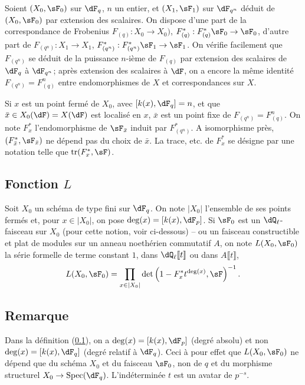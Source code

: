 Soient $(X_0,\sF_0)$ sur $\dF_q$, $n$ un entier, et $(X_1,\sF_1)$ sur 
$\dF_{q^n}$ déduit de $(X_0,\sF_0)$ par extension des scalaires. On dispose 
d'une part de la correspondance de Frobenius $F_{(q)}:X_0\to X_0)$, 
$F_{(q)}^*:F_{(q)}^*\sF_0\to \sF_0$, d'autre part de 
$F_{(q^n)}:X_1\to X_1$, $F_{(q^n)}^*:F_{(q^n)}^*\sF_1\to\sF_1$. On vérifie 
facilement que $F_{(q^n)}$ se déduit de la puissance $n$-ième de $F_{(q)}$ 
par extension des scalaires de $\dF_q$ à $\dF_{q^n}$; après extension des 
scalaires à $\dF$, on a encore la même identité $F_{(q^n)}=F_{(q)}^n$ 
entre endomorphismes de $X$ et correspondances sur $X$. 

Si $x$ est un point fermé de $X_0$, avec $[k(x),\dF_q]=n$, et que 
$\bar x\in X_0(\dF) = X(\dF)$ est localisé en $x$, $\bar x$ est un point 
fixe de $F_{(q^n)}=F_{(q)}^n$. On note $F_x^*$ l'endomorphisme de 
$\sF_{\bar x}$ induit par $F_{(q^n)}^*$. A isomorphisme près, 
$(F_{\bar x}^*,\sF_{\bar x})$ ne dépend pas du choix de $\bar x$. La trace, 
etc. de $F_x^*$ se désigne par une notation telle que 
$\tr(F_x^*,\sF)$. 





\subsection{Fonction \texorpdfstring{$L$}{L}}\label{II:1-6}

Soit $X_0$ un schéma de type fini sur $\dF_q$. On note $|X_0|$ l'ensemble de 
ses points fermés et, pour $x\in |X_0|$, on pose $\deg(x)=[k(x),\dF_p]$. Si 
$\sF_0$ est un $\dQ_\ell$-faisceau sur $X_0$ (pour cette notion, voir 
ci-dessous) -- ou un faisceau constructible et plat de modules sur un 
anneau noethérien commutatif $A$, on note $L(X_0,\sF_0)$ la série formelle 
de terme constant $1$, dans $\dQ_\ell\llbracket t\rrbracket$ ou dans 
$A\llbracket t\rrbracket$, 
\[
  L(X_0,\sF_0) = \prod_{x\in|X_0|} \det\left(1-F_x^* t^{\deg(x)},\sF\right)^{-1} \text{.}
\]





\subsection{Remarque}\label{II:1-7}

Dans la définition (\ref{II:1-6}), on a $\deg(x)=[k(x),\dF_p]$ (degré 
absolu) et non $\deg(x)=[k(x),\dF_q]$ (degré relatif à $\dF_q$). Ceci à 
pour effet que $L(X_0,\sF_0)$ ne dépend que du schéma $X_0$ et du faisceau 
$\sF_0$, non de $q$ et du morphisme structurel $X_0\to\spec(\dF_q)$. 
L'indéterminée $t$ est un avatar de $p^{-s}$. 





